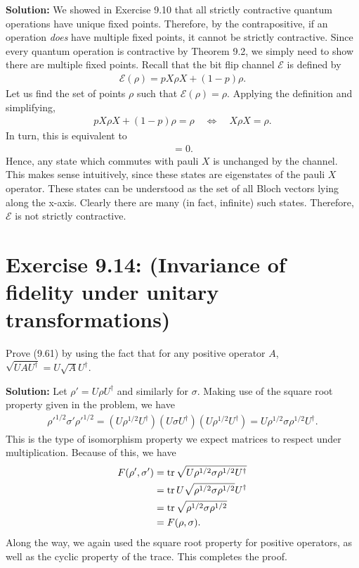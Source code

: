 \documentclass{book}
\newcommand{\mc}[1]{\mathcal{#1}}
\begin{document}
    \textbf{Solution:} We showed in Exercise 9.10 that all strictly contractive quantum operations have unique fixed points. Therefore, by the contrapositive, if an operation \emph{does} have multiple fixed points, it cannot be strictly contractive. Since every quantum operation is contractive by Theorem 9.2, we simply need to show there are multiple fixed points. Recall that the bit flip channel $\mc{E}$ is defined by
    \begin{align}
        \mc{E}(\rho) = p X\rho X + (1-p) \rho.
    \end{align}
    Let us find the set of points $\rho$ such that $\mc{E}(\rho) = \rho$. Applying the definition and simplifying,
    \begin{align}
        p X\rho X +(1-p)\rho = \rho \quad \Leftrightarrow \quad X \rho X = \rho.
    \end{align}
    In turn, this is equivalent to
    \begin{align}
        [\rho, X] = 0.
    \end{align}
    Hence, any state which commutes with pauli $X$ is unchanged by the channel. This makes sense intuitively, since these states are eigenstates of the pauli $X$ operator. These states can be understood as the set of all Bloch vectors lying along the x-axis. Clearly there are many (in fact, infinite) such states. Therefore, $\mc{E}$ is not strictly contractive.
    
\section*{Exercise 9.14: (Invariance of fidelity under unitary transformations)}
    Prove (9.61) by using the fact that for any positive operator $A$, $\sqrt{UAU^\dagger} = U\sqrt{A}U^\dagger$.
    
    \textbf{Solution:} Let $\rho' = U \rho U^\dagger$ and similarly for $\sigma$. Making use of the square root property given in the problem, we have
    \begin{align}
        \rho'^{1/2}\sigma'\rho'^{1/2} = (U\rho^{1/2} U^\dagger) (U \sigma U^\dagger) (U\rho^{1/2}U^\dagger) = U \rho^{1/2}\sigma\rho^{1/2}U^\dagger.
    \end{align}
    This is the type of isomorphism property we expect matrices to respect under multiplication. Because of this, we have
    \begin{align}
    \begin{aligned}
        F(\rho', \sigma') &= \tr\sqrt{U\rho^{1/2}\sigma\rho^{1/2}U^\dagger} \\
        &= \tr U \sqrt{\rho^{1/2}\sigma\rho^{1/2}} U^\dagger \\
        &= \tr \sqrt{\rho^{1/2}\sigma\rho^{1/2}} \\
        &= F(\rho, \sigma).
    \end{aligned}
    \end{align}
    Along the way, we again used the square root property for positive operators, as well as the cyclic property of the trace. This completes the proof.
    
\end{document}
